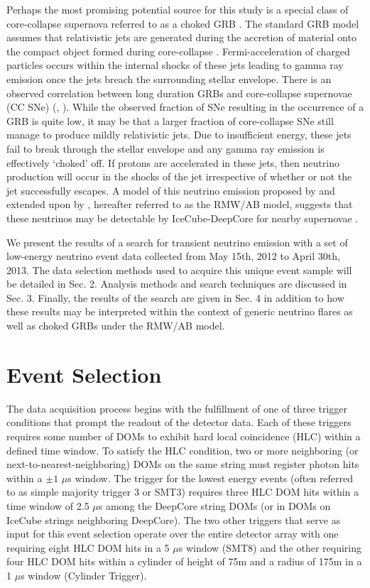 \documentclass[manuscript]{aastex}
\begin{document}
Perhaps the most promising potential source for this study is a special class of core-collapse supernova referred to as a choked GRB \citep{2001PhRvL..87q1102M}. The standard GRB model assumes that relativistic jets are generated during the accretion of material onto the compact object formed during core-collapse \citep{1992MNRAS.258P..41R}. Fermi-acceleration of charged particles occurs within the internal shocks of these jets leading to gamma ray emission once the jets breach the surrounding stellar envelope. There is an observed correlation between long duration GRBs and core-collapse supernovae (CC SNe) (\citep{2006ARA&A..44..507W}, \citep{2011AN....332..434M}). While the observed fraction of SNe resulting in the occurrence of a GRB is quite low, it may be that a larger fraction of core-collapse SNe still manage to produce mildly relativistic jets.  Due to insufficient energy, these jets fail to break through the stellar envelope and any gamma ray emission is effectively `choked' off. If protons are accelerated in these jets, then neutrino production will occur in the shocks of the jet irrespective of whether or not the jet successfully escapes. A model of this neutrino emission proposed by \cite{2004PhRvL..93r1101R} and extended upon by \cite{2005PhRvL..95f1103A}, hereafter referred to as the RMW/AB model, suggests that these neutrinos may be detectable by IceCube-DeepCore for nearby supernovae \citep{PhysRevD.81.083011}.

We present the results of a search for transient neutrino emission with a set of low-energy neutrino event data collected from May 15th, 2012 to April 30th, 2013. The data selection methods used to acquire this unique event sample will be detailed in Sec. 2. Analysis methods and search techniques are discussed in Sec. 3. Finally, the results of the search are given in Sec. 4 in addition to how these results may be interpreted within the context of generic neutrino flares as well as choked GRBs under the RMW/AB model.
\section{Event Selection}

The data acquisition process begins with the fulfillment of one of three trigger conditions that prompt the readout of the detector data. Each of these triggers requires some number of DOMs to exhibit hard local coincidence (HLC) within a defined time window. To satisfy the HLC condition, two or more neighboring (or next-to-nearest-neighboring) DOMs on the same string must register photon hits within a $\pm1$ $\mu$s window. The trigger for the lowest energy events (often referred to as simple majority trigger 3 or SMT3) requires three HLC DOM hits within a time window of 2.5 $\mu$s among the DeepCore string DOMs (or in DOMs on IceCube strings neighboring DeepCore). The two other triggers that serve as input for this event selection operate over the entire detector array with one requiring eight HLC DOM hits in a 5 $\mu$s window (SMT8) and the other requiring four HLC DOM hits within a cylinder of height of 75m and a radius of 175m in a 1 $\mu$s window (Cylinder Trigger).
\end{document}
